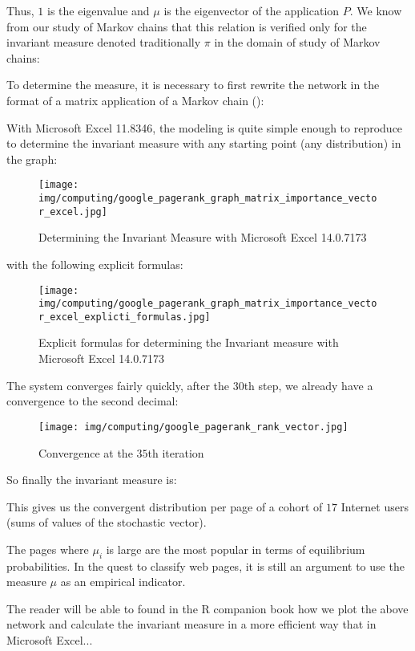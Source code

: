 	Thus, $1$ is the eigenvalue and $\mu$ is the eigenvector of the application $P$. We know from our study of Markov chains that this relation is verified only for the invariant measure denoted traditionally $\pi$ in the domain of study of Markov chains:
	
	To determine the measure, it is necessary to first rewrite the network in the format of a matrix application of a Markov chain ():
	
	With Microsoft Excel 11.8346, the modeling is quite simple enough to reproduce to determine the invariant measure with any starting point (any distribution) in the graph:
	\begin{figure}[H]
		\centering
		\texttt{[image: img/computing/google\_pagerank\_graph\_matrix\_importance\_vector\_excel.jpg]}
		\caption[]{Determining the Invariant Measure with Microsoft Excel 14.0.7173}
	\end{figure}
	with the following explicit formulas:
	\begin{figure}[H]
		\centering
		\texttt{[image: img/computing/google\_pagerank\_graph\_matrix\_importance\_vector\_excel\_explicti\_formulas.jpg]}
		\caption[]{Explicit formulas for determining the Invariant measure with Microsoft Excel 14.0.7173}
	\end{figure}
	The system converges fairly quickly, after the $30$th step, we already have a convergence to the second decimal:
	\begin{figure}[H]
		\centering
		\texttt{[image: img/computing/google\_pagerank\_rank\_vector.jpg]}
		\caption[]{Convergence at the $35$th iteration}
	\end{figure}
	So finally the invariant measure is:
	
	This gives us the convergent distribution per page of a cohort of $17$ Internet users (sums of values of the stochastic vector).

	The pages where $\mu_i$ is large are the most popular in terms of equilibrium probabilities. In the quest to classify web pages, it is still an argument to use the measure $\mu$ as an empirical indicator.
	
	\begin{tcolorbox}[title=Remark,colframe=black,arc=10pt]
	The reader will be able to found in the R companion book how we plot the above network and calculate the invariant measure in a more efficient way that in Microsoft Excel...
	\end{tcolorbox}
	
